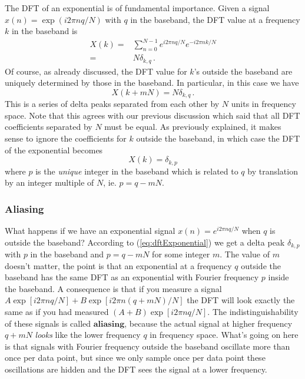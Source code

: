 The DFT of an exponential is of fundamental importance.
Given a signal $x(n)=\exp(i2\pi nq/N)$ with $q$ in the baseband, the DFT value at a frequency $k$ in the baseband is
\begin{align}
X(k) =& \sum_{n=0}^{N-1} e^{i2\pi nq/N}e^{-i2\pi nk/N} \\
=& N \delta_{k, q} \, .
\end{align}
Of course, as already discussed, the DFT value for $k$'s outside the baseband are uniquely determined by those in the baseband.
In particular, in this case we have
\begin{equation}
X(k + mN) = N \delta_{k, q} \, .
\end{equation}
This is a series of delta peaks separated from each other by $N$ units in frequency space.
Note that this agrees with our previous discussion which said that all DFT coefficients separated by $N$ must be equal.
As previously explained, it makes sense to ignore the coefficients for $k$ outside the baseband, in which case the DFT of the exponential becomes
\begin{equation}
X(k) = \delta_{k,p} \label{eq:dftExponential}
\end{equation}
where $p$ is the \emph{unique} integer in the baseband which is related to $q$ by translation by an integer multiple of $N$, ie. $p=q-mN$.

\subsubsection{Aliasing}

What happens if we have an exponential signal $x(n)=e^{i2\pi nq/N}$ when $q$ is outside the baseband?
According to (\ref{eq:dftExponential}) we get a delta peak $\delta_{k,p}$ with $p$ in the baseband and $p = q-mN$ for some integer $m$.
The value of $m$ doesn't matter, the point is that an exponential at a frequency $q$ outside the baseband has the same DFT as an exponential with Fourier frequency $p$ inside the baseband.
A consequence is that if you measure a signal $A\exp\left[i2\pi nq/N\right]+B\exp\left[i2\pi n(q+mN)/N\right]$ the DFT will look exactly the same as if you had measured $(A+B)\exp\left[i2\pi nq/N\right]$.
The indistinguishability of these signals is called $\textbf{aliasing}$, because the actual signal at higher frequency $q+mN$ \emph{looks} like the lower frequency $q$ in frequency space.
What's going on here is that signals with Fourier frequency outside the baseband oscillate more than once per data point, but since we only sample once per data point these oscillations are hidden and the DFT sees the signal at a lower frequency.


